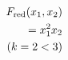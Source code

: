 \documentclass[preview]{standalone}
\begin{document}
\begin{align*}
\special{dvisvgm:raw <g id='unique000'>}F_{\text{red}}(x_1, x_2)\\= x_1^2 x_2\\(k=2 < 3)\special{dvisvgm:raw </g>}
\end{align*}
\end{document}
